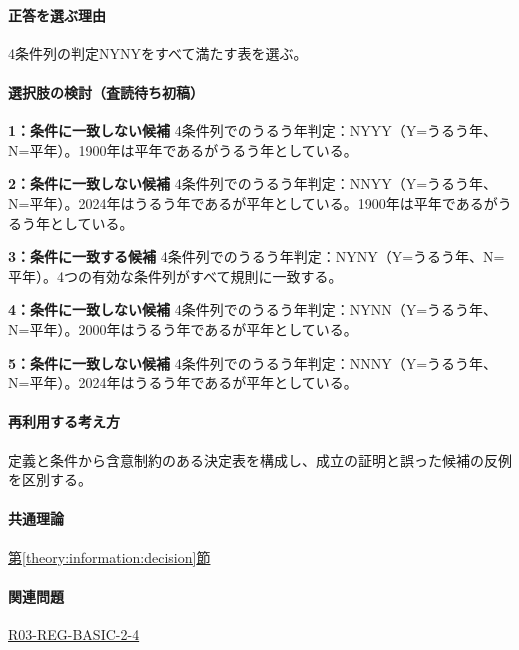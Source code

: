 \paragraph{正答を選ぶ理由} 4条件列の判定NYNYをすべて満たす表を選ぶ。

\paragraph{選択肢の検討（査読待ち初稿）}\mbox{}\par

\noindent\textbf{1：条件に一致しない候補} 4条件列でのうるう年判定：NYYY（Y=うるう年、N=平年）。1900年は平年であるがうるう年としている。\par

\noindent\textbf{2：条件に一致しない候補} 4条件列でのうるう年判定：NNYY（Y=うるう年、N=平年）。2024年はうるう年であるが平年としている。1900年は平年であるがうるう年としている。\par

\noindent\textbf{3：条件に一致する候補} 4条件列でのうるう年判定：NYNY（Y=うるう年、N=平年）。4つの有効な条件列がすべて規則に一致する。\par

\noindent\textbf{4：条件に一致しない候補} 4条件列でのうるう年判定：NYNN（Y=うるう年、N=平年）。2000年はうるう年であるが平年としている。\par

\noindent\textbf{5：条件に一致しない候補} 4条件列でのうるう年判定：NNNY（Y=うるう年、N=平年）。2024年はうるう年であるが平年としている。\par

\paragraph{再利用する考え方} 定義と条件から含意制約のある決定表を構成し、成立の証明と誤った候補の反例を区別する。

\paragraph{共通理論} \hyperref[theory:information:decision]{第\ref*{theory:information:decision}節}

\paragraph{関連問題} \hyperref[q:r03-reg-basic-2-4]{R03-REG-BASIC-2-4}

